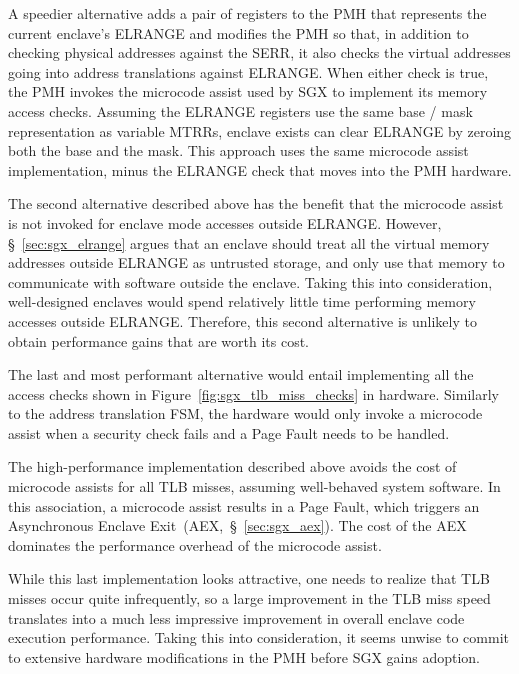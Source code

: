 A speedier alternative adds a pair of registers to the PMH that represents the
current enclave's ELRANGE and modifies the PMH so that, in addition to checking
physical addresses against the SERR, it also checks the virtual addresses
going into address translations against ELRANGE. When either check is true, the
PMH invokes the microcode assist used by SGX to implement its memory access
checks. Assuming the ELRANGE registers use the same base / mask representation
as variable MTRRs, enclave exists can clear ELRANGE by zeroing both the base
and the mask. This approach uses the same microcode assist implementation,
minus the ELRANGE check that moves into the PMH hardware.

The second alternative described above has the benefit that the microcode
assist is not invoked for enclave mode accesses outside ELRANGE. However,
\S~\ref{sec:sgx_elrange} argues that an enclave should treat all the virtual
memory addresses outside ELRANGE as untrusted storage, and only use that memory
to communicate with software outside the enclave. Taking this into
consideration, well-designed enclaves would spend relatively little time
performing memory accesses outside ELRANGE. Therefore, this second alternative
is unlikely to obtain performance gains that are worth its cost.

The last and most performant alternative would entail implementing all the
access checks shown in Figure~\ref{fig:sgx_tlb_miss_checks} in hardware.
Similarly to the address translation FSM, the hardware would only invoke a
microcode assist when a security check fails and a Page Fault needs to be
handled.

The high-performance implementation described above avoids the cost of
microcode assists for all TLB misses, assuming well-behaved system software.
In this association, a microcode assist results in a Page Fault, which triggers
an Asynchronous Enclave Exit~(AEX,~\S~\ref{sec:sgx_aex}). The cost of the AEX
dominates the performance overhead of the microcode assist.

While this last implementation looks attractive, one needs to realize that
TLB misses occur quite infrequently, so a large improvement in the TLB miss
speed translates into a much less impressive improvement in overall enclave
code execution performance. Taking this into consideration, it seems unwise to
commit to extensive hardware modifications in the PMH before SGX gains
adoption.



